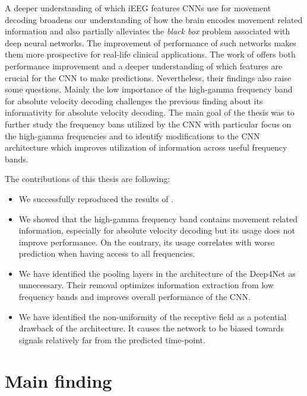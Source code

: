 


A deeper understanding of which iEEG features CNNs use for movement decoding broadens our understanding of how the brain encodes movement related information and also partially alleviates the \textit{black box} problem associated with deep neural networks.
The improvement of performance of such networks makes them more prospective for real-life clinical applications.
The work of \cite{Hammer-2021} offers both performance improvement and a deeper understanding of which features are crucial for the CNN to make predictions.
Nevertheless, their findings also raise some questions.
Mainly the low importance of the high-gamma frequency band for absolute velocity decoding challenges the previous finding about its informativity for absolute velocity decoding.
The main goal of the thesis was to further study the frequency bans utilized by the CNN with particular focus on the high-gamma frequencies and to identify modifications to the CNN architecture which improves utilization of information across useful frequency bands. 

The contributions of this thesis are following:
\begin{itemize}
    \item We successfully reproduced the results of \cite{Hammer-2021}.
    \item We showed that the high-gamma frequency band contains movement related information, especially for absolute velocity decoding but its usage does not improve performance. On the contrary, its usage correlates with worse prediction when having access to all frequencies.
    \item We have identified the pooling layers in the architecture of the Deep4Net as unnecessary. Their removal optimizes information extraction from low frequency bands and improves overall performance of the CNN.
    \item We have identified the non-uniformity of the receptive field as a potential drawback of the architecture. It causes the network to be biased towards signals relatively far from the predicted time-point.
\end{itemize}


\section*{Main finding}

